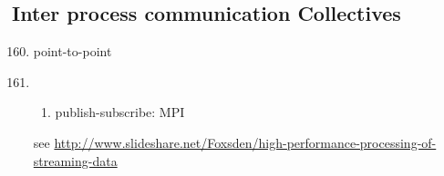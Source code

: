 \subsection{Inter process communication Collectives}
\label{\detokenize{i524/technologies:inter-process-communication-collectives}}\begin{enumerate}
\setcounter{enumi}{159}
\item {} 
point-to-point

\item {} \begin{enumerate}
\item {} 
publish-subscribe: MPI

\end{enumerate}

see \url{http://www.slideshare.net/Foxsden/high-performance-processing-of-streaming-data}

\end{enumerate}
